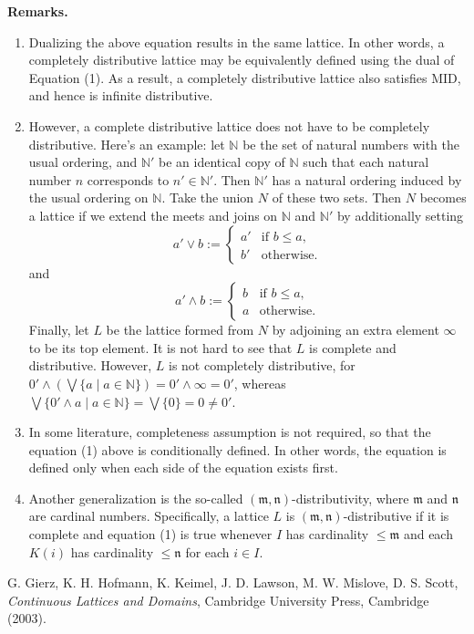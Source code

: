 \documentclass[12pt]{article}
\begin{document}
\textbf{Remarks.}  
\begin{enumerate}
\item Dualizing the above equation results in the same lattice.  In other words, a completely distributive lattice may be equivalently defined using the dual of Equation (1).  As a result, a completely distributive lattice also satisfies MID, and hence is infinite distributive.
\item However, a complete distributive lattice does not have to be completely distributive.  Here's an example: let $\mathbb{N}$ be the set of natural numbers with the usual ordering, and $\mathbb{N}'$ be an identical copy of $\mathbb{N}$ such that each natural number $n$ corresponds to $n'\in \mathbb{N}'$.  Then $\mathbb{N}'$ has a natural ordering induced by the usual ordering on $\mathbb{N}$.  Take the union $N$ of these two sets.  Then $N$ becomes a lattice if we extend the meets and joins on $\mathbb{N}$ and $\mathbb{N}'$ by additionally setting 
\begin{displaymath}
a'\vee b:= \left\{
\begin{array}{ll}
a' & \textrm{if } b\le a, \\
b' & \textrm{otherwise.}
\end{array}
\right.
\end{displaymath}
and 
\begin{displaymath}
a' \wedge b:= \left\{
\begin{array}{ll}
b & \textrm{if } b\le a, \\
a & \textrm{otherwise.}
\end{array}
\right.
\end{displaymath}
Finally, let $L$ be the lattice formed from $N$ by adjoining an extra element $\infty$ to be its top element.  It is not hard to see that $L$ is complete and distributive.  However, $L$ is not completely distributive, for $0' \wedge (\bigvee \lbrace a\mid a\in \mathbb{N}\rbrace )=0' \wedge \infty =0'$, whereas $\bigvee \lbrace 0'\wedge a \mid a\in \mathbb{N} \rbrace = \bigvee \lbrace 0\rbrace = 0 \ne 0'$.

\item In some literature, completeness assumption is not required, so that the equation (1) above is conditionally defined.  In other words, the equation is defined only when each side of the equation exists first.

\item Another generalization is the so-called $(\mathfrak{m},\mathfrak{n})$-distributivity, where $\mathfrak{m}$ and $\mathfrak{n}$ are cardinal numbers.  Specifically, a lattice $L$ is $(\mathfrak{m},\mathfrak{n})$-distributive if it is complete and equation (1) is true whenever $I$ has cardinality $\le \mathfrak{m}$ and each $K(i)$ has cardinality $\le \mathfrak{n}$ for each $i\in I$.
\end{enumerate}

\begin{thebibliography}{8}
 G. Gierz, K. H. Hofmann, K. Keimel, J. D. Lawson, M. W. Mislove, D. S. Scott, {\em Continuous Lattices and Domains}, Cambridge University Press, Cambridge (2003).
\end{thebibliography}
\end{document}
